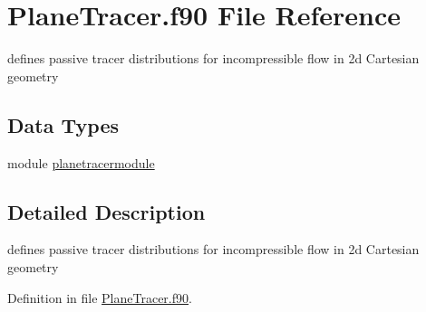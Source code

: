 \hypertarget{_plane_tracer_8f90}{\section{Plane\+Tracer.\+f90 File Reference}
\label{_plane_tracer_8f90}
}


defines passive tracer distributions for incompressible flow in 2d Cartesian geometry  


\subsection*{Data Types}
\begin{DoxyCompactItemize}
\item 
module \hyperlink{classplanetracermodule}{planetracermodule}
\end{DoxyCompactItemize}


\subsection{Detailed Description}
defines passive tracer distributions for incompressible flow in 2d Cartesian geometry 



Definition in file \hyperlink{_plane_tracer_8f90_source}{Plane\+Tracer.\+f90}.

